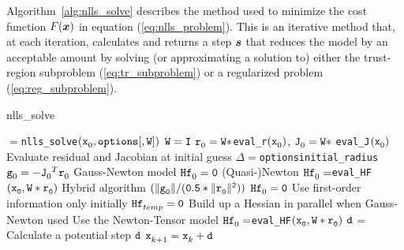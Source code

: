 \label{sec:Method}

Algorithm~\ref{alg:nlls_solve} describes the method used to minimize the cost function
$F(\vx)$ in equation (\ref{eq:nlls_problem}). This is an iterative method that, at each iteration, calculates and returns a step $\vs$ that reduces the model by an acceptable amount by solving (or approximating a solution to) either the trust-region subproblem (\ref{eq:tr_subproblem}) or a regularized problem (\ref{eq:reg_subproblem}). 

\begin{algorithm}
\caption{nlls\_solve}
\label{alg:nlls_solve}
  \begin{algorithmic}[1]
    $=${\tt nlls\_solve}$(\iter[0]{\tx},\text{\tt options}{\tt[,W]})$
    \State ${\tt W=I}$
    \EndIf
    \State $\iter[0]{\tr} =  {\tt W * }${\tt eval\_r}$(\iter[0]{\tx})$, $\iter[0]{\tJ} = {\tt W *}$ {\tt eval\_J}$(\iter[0]{\tx})$    
    \Comment Evaluate residual and Jacobian at initial guess
    \State $\Delta = ${\tt options\ct initial\_radius}
    \State $ \iter[0]{\tg} = - {\iter[0]{\tJ}}^T\iter[0]{\tr}$
    \Comment Gauss-Newton model 
    \State $\iter[0]{\thess} = {\tt 0}$
    \Comment (Quasi-)Newton 
    \State $\iter[0]{\thess} = ${\tt eval\_HF}${\tt (\iter[0]{\tx},W * \iter[0]{\tr})}$
    \Comment Hybrid algorithm
    ${\tt (\| \iter[0]{\tg} \| / (0.5 * \|\iter[0]{\tr}\|^2) )}$
    \State $\iter[0]{\thess} = {\tt 0}$
    \Comment Use first-order information only initially
    \State ${\iter[temp]{\thess}} = {\tt 0}$
    \Comment Build up a Hessian in parallel when Gauss-Newton used
    \Comment Use the Newton-Tensor model
    \State $\iter[0]{\thess} = ${\tt eval\_HF}${\tt (\iter[0]{\tx},W * \iter[0]{\tr})}$
    \EndIf
        \State ${\td}$ = 
        \Comment Calculate a potential step $\td$
        \State $\iter[k+1]{\tx} = \iter[k]{\tx} + \td$

\end{algorithmic}
\end{algorithm}
